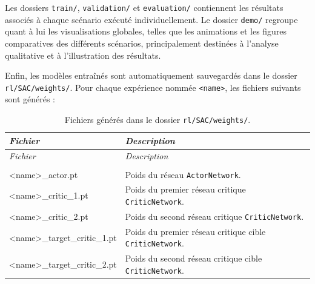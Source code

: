 \begin{tcolorbox}[colback=YellowGreen!5,colframe=YellowGreen,title=Remarque]
    Les dossiers \texttt{train/}, \texttt{validation/} et \texttt{evaluation/} contiennent les résultats associés à chaque scénario exécuté individuellement. Le dossier \texttt{demo/} regroupe quant à lui les visualisations globales, telles que les animations et les figures comparatives des différents scénarios, principalement destinées à l'analyse qualitative et à l'illustration des résultats.
\end{tcolorbox}

\noindent Enfin, les modèles entraînés sont automatiquement sauvegardés dans le dossier \texttt{rl/SAC/weights/}. Pour chaque expérience nommée \texttt{<name>}, les fichiers suivants sont générés :

\begin{longtable}{
        >{\ttfamily\small}p{}
        p{}
    }
    \caption{Fichiers générés dans le dossier \texttt{rl/SAC/weights/}.}
    \label{tab:weights_files}                                                                      \\

    \toprule
    \textnormal{\textit{Fichier}} &
    \textit{Description}                                                                           \\
    \midrule
    \endfirsthead

    \toprule
    \textnormal{\textit{Fichier}} &
    \textit{Description}                                                                           \\
    \midrule
    \endhead

    \midrule
    \\
    \endfoot

    \bottomrule
    \endlastfoot

    <name>\_actor.pt
                                  & Poids du réseau \texttt{ActorNetwork}.                         \\

    <name>\_critic\_1.pt
                                  & Poids du premier réseau critique \texttt{CriticNetwork}.       \\

    <name>\_critic\_2.pt
                                  & Poids du second réseau critique \texttt{CriticNetwork}.        \\

    <name>\_target\_critic\_1.pt
                                  & Poids du premier réseau critique cible \texttt{CriticNetwork}. \\

    <name>\_target\_critic\_2.pt
                                  & Poids du second réseau critique cible \texttt{CriticNetwork}.  \\
\end{longtable}

